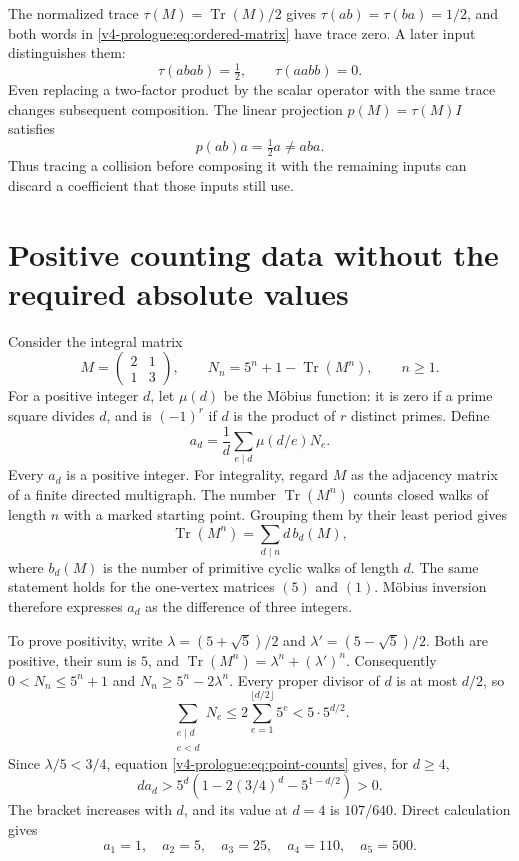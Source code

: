 The normalized trace \(\tau(M)=\operatorname{Tr}(M)/2\) gives
\(\tau(ab)=\tau(ba)=1/2\), and both words in
\eqref{v4-prologue:eq:ordered-matrix} have trace zero. A later
input distinguishes them:
\[
 \tau(abab)=\tfrac12,\qquad \tau(aabb)=0.
\]
Even replacing a two-factor product by the scalar operator with the
same trace changes subsequent composition. The linear projection
\(p(M)=\tau(M)I\) satisfies
\[
 p(ab)a=\tfrac12a\ne aba.
\]
Thus tracing a collision before composing it with the remaining
inputs can discard a coefficient that those inputs still use.

\section*{Positive counting data without the required absolute values}
\label{v4-prologue:synthetic}

Consider the integral matrix
\[
 M=\begin{pmatrix}2&1\\1&3\end{pmatrix},
 \qquad N_n=5^n+1-\operatorname{Tr}(M^n),\qquad n\ge1.
\]
For a positive integer \(d\), let \(\mu(d)\) be the M\"obius
function: it is zero if a prime square divides \(d\), and is
\((-1)^r\) if \(d\) is the product of \(r\) distinct primes.
Define
\begin{equation}\label{v4-prologue:eq:point-counts}
 a_d=\frac1d\sum_{e\mid d}\mu(d/e)N_e.
\end{equation}
Every \(a_d\) is a positive integer. For integrality, regard
\(M\) as the adjacency matrix of a finite directed multigraph.
The number \(\operatorname{Tr}(M^n)\) counts closed walks of
length \(n\) with a marked starting point. Grouping them by their
least period gives
\[
 \operatorname{Tr}(M^n)=\sum_{d\mid n}d\,b_d(M),
\]
where \(b_d(M)\) is the number of primitive cyclic walks of
length \(d\). The same statement holds for the one-vertex
matrices \((5)\) and \((1)\). M\"obius inversion therefore
expresses \(a_d\) as the difference of three integers.

To prove positivity, write
\(\lambda=(5+\sqrt5)/2\) and \(\lambda'=(5-\sqrt5)/2\).
Both are positive, their sum is \(5\), and
\(\operatorname{Tr}(M^n)=\lambda^n+(\lambda')^n\).
Consequently \(0<N_n\le5^n+1\) and
\(N_n\ge5^n-2\lambda^n\).
Every proper divisor of \(d\) is at most \(d/2\), so
\[
 \sum_{\substack{e\mid d\\e<d}}N_e
 \le2\sum_{e=1}^{\lfloor d/2\rfloor}5^e
 <5\cdot5^{d/2}.
\]
Since \(\lambda/5<3/4\), equation
\eqref{v4-prologue:eq:point-counts} gives, for \(d\ge4\),
\[
 da_d>
 5^d\left(1-2(3/4)^d-5^{1-d/2}\right)>0.
\]
The bracket increases with \(d\), and its value at \(d=4\)
is \(107/640\). Direct calculation gives
\[
 a_1=1,\quad a_2=5,\quad a_3=25,
 \quad a_4=110,\quad a_5=500.
\]

